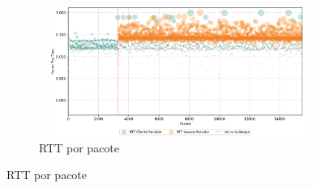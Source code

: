 \begin{apendicesenv}
\begin{figure}[htbp!]
\begin{subfigure}[t]{0.5\textwidth}
        \centering
        \caption{RTT por pacote}
        \includegraphics[width=1\textwidth, height=120pt]{USPSC-img/output/cropped/2-dos_open_multiple_secure_channels-rttp.png}
    \end{subfigure}%
\end{figure}


\end{apendicesenv}
